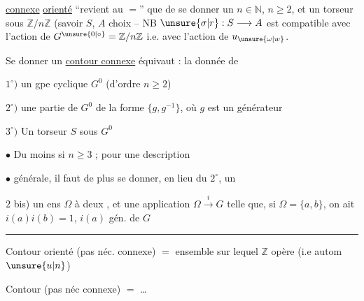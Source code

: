 \uline{connexe} \uline{orienté} ``revient au $=$'' que de se donner un $n\in\mathbb{N}$, $n\geq2$, et un  torseur sous $\mathbb{Z}/n\mathbb{Z}$ (savoir $S$,  $A$  choix -- NB $\unsure{\sigma|r}:S\longrightarrow A$ est compatible avec l'action de $G^{\unsure{0|\circ}}=\mathbb{Z}/n\mathbb{Z}$ i.e. avec l'action de $u_{\unsure{\omega|w}}$.

Se donner un \uline{contour connexe} équivaut : la donnée de

$1^{\circ})$ un gpe cyclique $G^{0}$ (d'ordre $n\geq2$)

$2^{\circ})$ une  partie de $G^{0}$  de la forme $\{g,g^{-1}\}$, où $g$ est un générateur 

$3^{\circ})$ Un torseur $S$ sous $G^{0}$

$\bullet$ Du moins si $n\geq3$  ; pour une description

$\bullet$ générale, il faut de plus se donner, en lieu du $2^{\circ}$, un

$2$ bis) un ens $\Omega$ à deux , et une application $\Omega\xrightarrow{i}G$ telle que, si $\Omega=\{a,b\}$, on ait $i(a)i(b)=1$, $i(a)$ gén. de $G$

\begin{center}\rule{1cm}{.35pt}\end{center}

Contour orienté (pas néc. connexe) $=$ ensemble sur lequel $\mathbb{Z}$ opère (i.e  autom $\unsure{u|n}$)

Contour (pas néc connexe) $=$ \ldots
